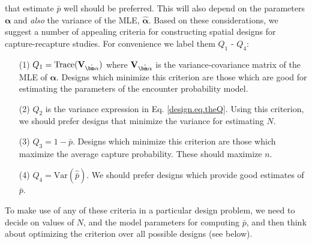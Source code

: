  that estimate $\bar{p}$ well should be preferred.  This will also
 depend on the parameters ${\bm \alpha}$ and {\it also} the variance
 of the MLE, $\hat{\bm \alpha}$. 
 Based on these considerations, 
we suggest a number of appealing criteria for constructing spatial
designs for capture-recapture studies.
For convenience we label them $Q_{1}$ - $Q_{4}$:
\begin{itemize}
\item[(1)] $Q_{1} = \mbox{Trace}({\bf V}_{\hat{\bm \alpha}})$ where ${\bf
    V}_{\hat{\bm \alpha}}$ is the variance-covariance matrix of the
  MLE of ${\bm \alpha}$. Designs which minimize this criterion
  are those which are good for estimating the parameters of the
  encounter probability model. 
\item[(2)] $Q_{2}$ is the variance expression in
  Eq. \ref{design.eq.theQ}. Using this criterion, we should prefer designs that minimize
  the variance for estimating $N$.
\item[(3)] $Q_{3} = 1-\bar{p}$. Designs which minimize this criterion
  are those which maximize the average capture probability. These
  should maximize $n$.
\item[(4)] $Q_{4} = \mbox{Var}(\hat{\bar{p}})$. We should prefer
  designs which provide good estimates of $\bar{p}$. 
\end{itemize}
To make use of any of these criteria in a particular design problem, we need
to decide on values of $N$, and the model parameters for computing
$\bar{p}$, and then think about optimizing the criterion over all
possible designs (see below).


